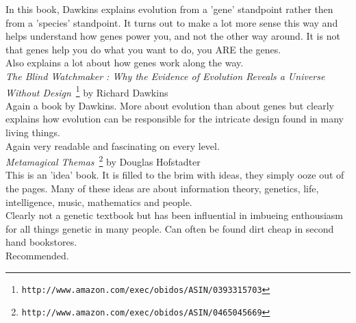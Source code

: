 \documentclass[11pt,twoside,a4paper]{article}
\begin{document}
In this book, Dawkins explains evolution from a 'gene' standpoint rather then from a 'species' standpoint. It turns out to make a lot more sense this way and helps understand how genes power you, and not the other way around. It is not that genes help you do what you want to do, you ARE the genes. ~\\

Also explains a lot about how genes work along the way. ~\\

\emph{The Blind Watchmaker : Why the Evidence of Evolution Reveals a Universe Without Design}~\footnote{\texttt{http://www.amazon.com/exec/obidos/ASIN/0393315703}} by Richard Dawkins ~\\
Again a book by Dawkins. More about evolution than about genes but clearly explains how evolution can be responsible for the intricate design found in many living things. ~\\

Again very readable and fascinating on every level. ~\\

\emph{Metamagical Themas}~\footnote{\texttt{http://www.amazon.com/exec/obidos/ASIN/0465045669}} by Douglas Hofstadter ~\\
This is an 'idea' book. It is filled to the brim with ideas, they simply ooze out of the pages. Many of these ideas are about information theory, genetics, life, intelligence, music, mathematics and people. ~\\

Clearly not a genetic textbook but has been influential in imbueing enthousiasm for all things genetic in many people. Can often be found dirt cheap in second hand bookstores. ~\\

Recommended. ~\\

\clearpage

\end{document}
